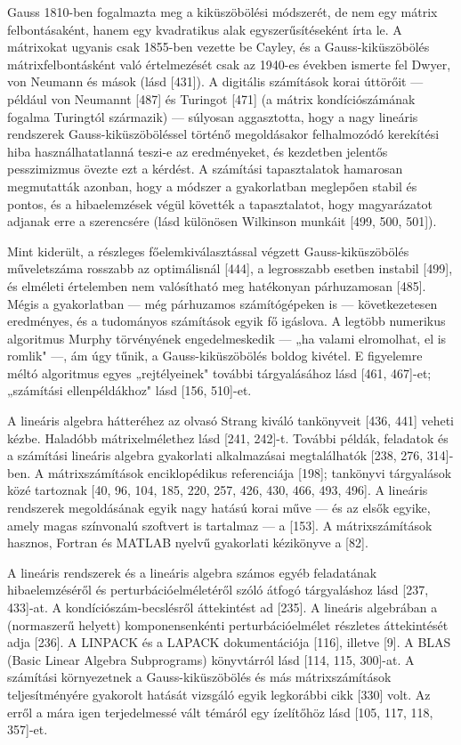 \documentclass[
  magyar,
  11pt]{article}
\begin{document}
Gauss 1810-ben fogalmazta meg a kiküszöbölési módszerét, de nem egy
mátrix felbontásaként, hanem egy kvadratikus alak egyszerűsítéseként
írta le. A mátrixokat ugyanis csak 1855-ben vezette be Cayley, és a
Gauss-kiküszöbölés mátrixfelbontásként való értelmezését csak az 1940-es
években ismerte fel Dwyer, von Neumann és mások (lásd {[}431{]}). A
digitális számítások korai úttörőit --- például von Neumannt {[}487{]}
és Turingot {[}471{]} (a mátrix kondíciószámának fogalma Turingtól
származik) --- súlyosan aggasztotta, hogy a nagy lineáris rendszerek
Gauss-kiküszöböléssel történő megoldásakor felhalmozódó kerekítési hiba
használhatatlanná teszi-e az eredményeket, és kezdetben jelentős
pesszimizmus övezte ezt a kérdést. A számítási tapasztalatok hamarosan
megmutatták azonban, hogy a módszer a gyakorlatban meglepően stabil és
pontos, és a hibaelemzések végül követték a tapasztalatot, hogy
magyarázatot adjanak erre a szerencsére (lásd különösen Wilkinson
munkáit {[}499, 500, 501{]}).

Mint kiderült, a részleges főelemkiválasztással végzett
Gauss-kiküszöbölés műveletszáma rosszabb az optimálisnál {[}444{]}, a
legrosszabb esetben instabil {[}499{]}, és elméleti értelemben nem
valósítható meg hatékonyan párhuzamosan {[}485{]}. Mégis a gyakorlatban
--- még párhuzamos számítógépeken is --- következetesen eredményes, és a
tudományos számítások egyik fő igáslova. A legtöbb numerikus algoritmus
Murphy törvényének engedelmeskedik --- „ha valami elromolhat, el is
romlik" ---, ám úgy tűnik, a Gauss-kiküszöbölés boldog kivétel. E
figyelemre méltó algoritmus egyes „rejtélyeinek" további tárgyalásához
lásd {[}461, 467{]}-et; „számítási ellenpéldákhoz" lásd {[}156,
510{]}-et.

A lineáris algebra hátteréhez az olvasó Strang kiváló tankönyveit
{[}436, 441{]} veheti kézbe. Haladóbb mátrixelmélethez lásd {[}241,
242{]}-t. További példák, feladatok és a számítási lineáris algebra
gyakorlati alkalmazásai megtalálhatók {[}238, 276, 314{]}-ben. A
mátrixszámítások enciklopédikus referenciája {[}198{]}; tankönyvi
tárgyalások közé tartoznak {[}40, 96, 104, 185, 220, 257, 426, 430, 466,
493, 496{]}. A lineáris rendszerek megoldásának egyik nagy hatású korai
műve --- és az elsők egyike, amely magas színvonalú szoftvert is
tartalmaz --- a {[}153{]}. A mátrixszámítások hasznos, Fortran és MATLAB
nyelvű gyakorlati kézikönyve a {[}82{]}.

A lineáris rendszerek és a lineáris algebra számos egyéb feladatának
hibaelemzéséről és perturbációelméletéről szóló átfogó tárgyaláshoz lásd
{[}237, 433{]}-at. A kondíciószám-becslésről áttekintést ad {[}235{]}. A
lineáris algebrában a (normaszerű helyett) komponensenkénti
perturbációelmélet részletes áttekintését adja {[}236{]}. A LINPACK és a
LAPACK dokumentációja {[}116{]}, illetve {[}9{]}. A BLAS (Basic Linear
Algebra Subprograms) könyvtárról lásd {[}114, 115, 300{]}-at. A
számítási környezetnek a Gauss-kiküszöbölés és más mátrixszámítások
teljesítményére gyakorolt hatását vizsgáló egyik legkorábbi cikk
{[}330{]} volt. Az erről a mára igen terjedelmessé vált témáról egy
ízelítőhöz lásd {[}105, 117, 118, 357{]}-et.
\end{document}
